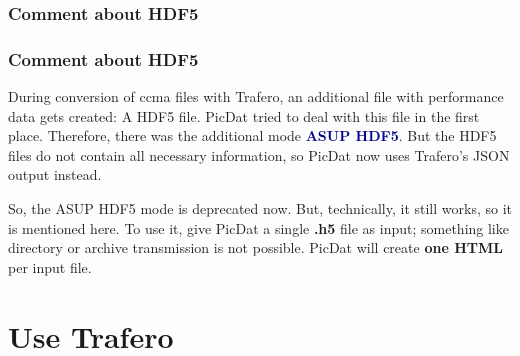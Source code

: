 \documentclass[8pt]{beamer}
\begin{document}
\subsubsection{Comment about HDF5}

\begin{frame}
\frametitle{Comment about HDF5}
During conversion of ccma files with Trafero, an additional file with performance data gets created: A HDF5 file. PicDat tried to deal with this file in the first place. Therefore, there was the additional mode \textcolor{darkblue}{\textbf{ASUP HDF5}}. But the HDF5 files do not contain all necessary information, so PicDat now uses Trafero's JSON output instead.
\bigskip

So, the ASUP HDF5 mode is deprecated now. But, technically, it still works, so it is mentioned here. To use it, give PicDat a single \textbf{.h5} file as input; something like directory or archive transmission is not possible. PicDat will create \textbf{one HTML} per input file. 
\end{frame}

\section{Use Trafero}
\end{document}
